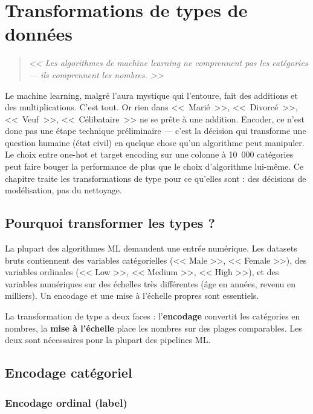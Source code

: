 \chapter{Transformations de types de donn\'ees}
\label{ch:type-transforms}

\begin{quote}
\emph{<< Les algorithmes de machine learning ne comprennent pas les cat\'egories --- ils comprennent les nombres. >>}
\end{quote}

Le machine learning, malgré l'aura mystique qui l'entoure, fait des additions et des multiplications. C'est tout. Or rien dans <<~Marié~>>, <<~Divorcé~>>, <<~Veuf~>>, <<~Célibataire~>> ne se prête à une addition. Encoder, ce n'est donc pas une étape technique préliminaire --- c'est la décision qui transforme une question humaine (état civil) en quelque chose qu'un algorithme peut manipuler. Le choix entre one-hot et target encoding sur une colonne à 10~000 catégories peut faire bouger la performance de plus que le choix d'algorithme lui-même. Ce chapitre traite les transformations de type pour ce qu'elles sont : des décisions de modélisation, pas du nettoyage.
\section{Pourquoi transformer les types ?}

La plupart des algorithmes ML demandent une entr\'ee num\'erique. Les datasets bruts contiennent des variables cat\'egorielles (<< Male >>, << Female >>), des variables ordinales (<< Low >>, << Medium >>, << High >>), et des variables num\'eriques sur des \'echelles tr\`es diff\'erentes (\^age en ann\'ees, revenu en milliers). Un encodage et une mise \`a l'\'echelle propres sont essentiels.

\begin{datatip}
La transformation de type a deux faces : l'\textbf{encodage} convertit les cat\'egories en nombres, la \textbf{mise \`a l'\'echelle} place les nombres sur des plages comparables. Les deux sont n\'ecessaires pour la plupart des pipelines ML.
\end{datatip}

\section{Encodage cat\'egoriel}

\subsection{Encodage ordinal (label)}

